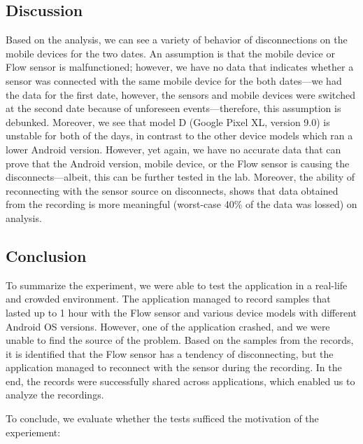 \subsection{Discussion}

Based on the analysis, we can see a variety of behavior of disconnections on the mobile devices for the two dates. An assumption is that the mobile device or Flow sensor is malfunctioned; however, we have no data that indicates whether a sensor was connected with the same mobile device for the both dates---we had the data for the first date, however, the sensors and mobile devices were switched at the second date because of unforeseen events---therefore, this assumption is debunked. Moreover, we see that model D (Google Pixel XL, version 9.0) is unstable for both of the days, in contrast to the other device models which ran a lower Android version. However, yet again, we have no accurate data that can prove that the Android version, mobile device, or the Flow sensor is causing the disconnects---albeit, this can be further tested in the lab. Moreover, the ability of reconnecting with the sensor source on disconnects, shows that data obtained from the recording is more meaningful (worst-case 40\% of the data was lossed) on analysis.


\subsection{Conclusion}
To summarize the experiment, we were able to test the application in a real-life and crowded environment. The application managed to record samples that lasted up to 1 hour with the Flow sensor and various device models with different Android OS versions. However, one of the application crashed, and we were unable to find the source of the problem. Based on the samples from the records, it is identified that the Flow sensor has a tendency of disconnecting, but the application managed to reconnect with the sensor during the recording. In the end, the records were successfully shared across applications, which enabled us to analyze the recordings.  

To conclude, we evaluate whether the tests sufficed the motivation of the experiement:

